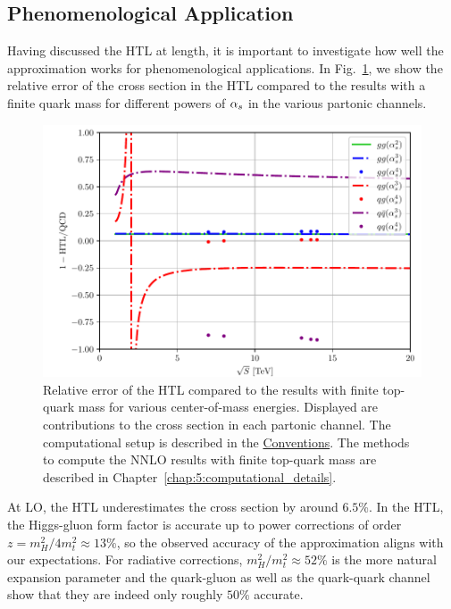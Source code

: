 \subsection{Phenomenological Application} \label{subsec:4:phenomenological_application}
Having discussed the \acs{HTL} at length, it is important to investigate how well the approximation works for phenomenological applications. In Fig.~\ref{fig:4:HTL_accuracy}, we show the relative error of the cross section in the \acs{HTL} compared to the results with a finite quark mass for different powers of $\alpha_s$ in the various partonic channels.

\begin{figure}[ht]
\centering
\includegraphics[width=\figurewidth]{Images/HTL_accuracy.pdf}
\caption{Relative error of the \acs{HTL} compared to the results with finite top-quark mass for various center-of-mass energies. Displayed are contributions to the cross section in each partonic channel. The computational setup is described in the \hyperref[chap:notation_and_conventions]{Conventions}. The methods to compute the \acs{NNLO} results with finite top-quark mass are described in Chapter~\ref{chap:5:computational_details}.}
\label{fig:4:HTL_accuracy}
\end{figure}
At \acs{LO}, the \acs{HTL} underestimates the cross section by around $6.5$\%. In the \acs{HTL}, the Higgs-gluon form factor is accurate up to power corrections of order $z = m_H^2/4m_t^2 \approx 13\%$, so the observed accuracy of the approximation aligns with our expectations. For radiative corrections, $m_H^2/m_t^2 \approx 52\%$ is the more natural expansion parameter and the quark-gluon as well as the quark-quark channel show that they are indeed only roughly $50\%$ accurate.

